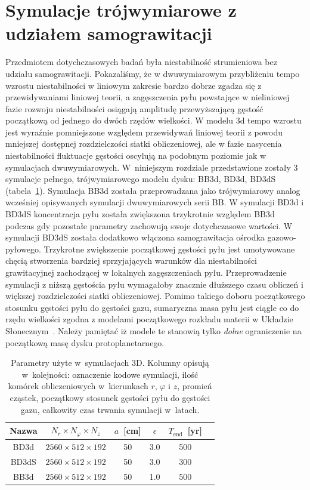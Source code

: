\section{Symulacje trójwymiarowe z udziałem samograwitacji}
\label{sec:sim_3d}
Przedmiotem dotychczasowych badań była niestabilność strumieniowa bez udziału
samograwitacji. Pokazaliśmy, że w dwuwymiarowym przybliżeniu tempo wzrostu
niestabilności w liniowym zakresie bardzo dobrze zgadza się z przewidywaniami
liniowej teorii, a zagęszczenia pyłu powstające w nieliniowej fazie rozwoju
niestabilności osiągają amplitudę przewyższającą gęstość początkową od jednego
do dwóch rzędów wielkości. W modelu 3d tempo wzrostu jest wyraźnie pomniejszone
względem przewidywań liniowej teorii z powodu mniejszej dostępnej rozdzielczości
siatki obliczeniowej, ale w fazie nasycenia niestabilności fluktuacje
gęstości oscylują na podobnym poziomie jak w symulacjach dwuwymiarowych. 
%
W~niniejszym rozdziale przedstawione zostały 3 symulacje pełnego,
trójwymiarowego modelu dysku: BB3d, BD3d, BD3dS (tabela~\ref{tab2}).  Symulacja
BB3d została przeprowadzana jako trójwymiarowy analog wcześniej opisywanych
symulacji dwuwymiarowych serii BB. W symulacji BD3d i BD3dS koncentracja pyłu
została zwiększona trzykrotnie względem BB3d podczas gdy pozostałe parametry
zachowują swoje dotychczasowe wartości. W symulacji BD3dS została dodatkowo
włączona samograwitacja ośrodka gazowo-pyłowego. Trzykrotne zwiększenie
początkowej gęstości pyłu jest umotywowane chęcią stworzenia bardziej
sprzyjających warunków dla niestabilności grawitacyjnej zachodzącej w lokalnych
zagęszczeniach pyłu. Przeprowadzenie symulacji z niższą gęstościa pyłu
wymagałoby znacznie dłuższego czasu obliczeń i większej rozdzielczości siatki
obliczeniowej. Pomimo takiego doboru początkowego stosunku gęstości pyłu do
gęstości gazu, sumaryczna masa pyłu jest ciągle co do rzędu wielkości zgodna z
modelami początkowego rozkładu materii w Układzie Słonecznym~\cite{D07}. Należy
pamiętać iż modele te stanowią tylko \emph{dolne} ograniczenie na początkową
masę dysku protoplanetarnego.

\begin{table}
   \centering
   \begin{tabular}{cccccc}
      \hline
      Nazwa & $N_r \times N_\varphi \times N_z$ &
      $a$~[cm] & $\epsilon$ & $T_\textrm{end}$~[yr] \\
      \hline
      BD3d  &  $2560  \times 512 \times 192$  & 50  & 3.0 & 500  \\
      BD3dS &  $2560  \times 512 \times 192$  & 50  & 3.0 & 300  \\
      BB3d  &  $2560  \times 512 \times 192$  & 50  & 1.0 & 500  \\
      \hline
   \end{tabular}
\caption{Parametry użyte w~symulacjach 3D. Kolumny opisują w~kolejności: oznaczenie
   kodowe symulacji, ilość komórek obliczeniowych w~kierunkach $r$, $\varphi$ i
   $z$, promień cząstek, początkowy stosunek gęstości pyłu do gęstości gazu,
całkowity czas trwania symulacji w~latach.}
\label{tab2}
\end{table}

